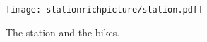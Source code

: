 \begin{figure}[h]
\centering
\texttt{[image: stationrichpicture/station.pdf]}
\caption{The station and the bikes.}
\label{fig:StationRichPicture}
\end{figure}

\begin{comment}
\begin{figure}[h]
\centering
\begin{subfigure}[b]{0.3\textwidth}
\centering
\texttt{[image: Bicyclewithlock/bicylewithlock.pdf]}
\caption{Locked bicycle.}
\label{fig:BicycleLocked}
\end{subfigure}
~
\begin{subfigure}[b]{0.3\textwidth}
\centering
\texttt{[image: Bicyclewithoutlock/bicylewithoutlock.pdf]}
\caption{Unlocked bicycle.}
\label{fig:BicycleUnlocked}
\end{subfigure}
\caption{Rich picture of bicycle.}
\label{fig:Bicycles}
\end{figure}
\end{comment}